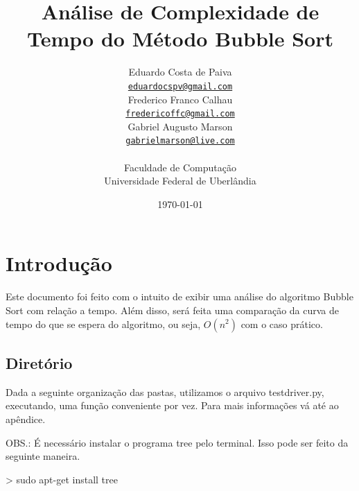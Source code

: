 \documentclass[12pt,a4paper,twoside]{report}
\title{Análise de Complexidade de Tempo do Método Bubble Sort}
\date{}
\author{Eduardo Costa de Paiva \\
\texttt{\small \url{eduardocspv@gmail.com}}\\
Frederico Franco Calhau \\
\texttt{\small \url{fredericoffc@gmail.com}}\\
Gabriel Augusto Marson \\
\texttt{\small \url{gabrielmarson@live.com}}\\
\vspace{1cm} \\
Faculdade de Computação \\
Universidade Federal de Uberlândia
}
\date{\today}
\begin{document}
  \maketitle
\listoffigures            
\listoftables            
\lstlistoflistings

\tableofcontents    


\fancyhead[RE,LO]{\thesection}

\setlength{\parskip}{0.15in} %

\chapter{Introdução}
Este documento foi feito com o intuito de exibir uma análise do algoritmo Bubble Sort 
com relação a tempo. Além disso, será feita uma comparação da curva de tempo do que se espera do
algoritmo, ou seja, $O(n^2)$ com o caso prático. 

\section{Diretório}

Dada a seguinte organização das pastas, utilizamos o arquivo testdriver.py,  executando, uma função conveniente por vez. Para mais informações vá até ao apêndice.

OBS.: É necessário instalar o programa tree pelo terminal. Isso pode ser feito da seguinte maneira.

\begin{terminal}
> sudo apt-get install tree
\end{terminal}
\end{document}
